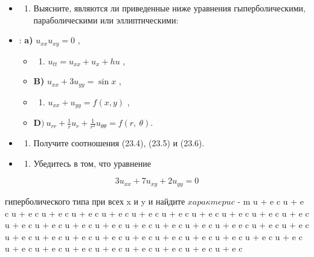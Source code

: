 \documentclass[
  ukrainian,
]{article}
\providecommand{\tightlist}{%
  \setlength{\itemsep}{0pt}\setlength{\parskip}{0pt}}
\begin{document}
\begin{itemize}
\tightlist
\item
  \begin{enumerate}
  \def\labelenumi{\arabic{enumi}.}
  \tightlist
  \item
    Выясните, являются ли приведенные ниже уравнения гыперболическими,
    параболическими или эллиптическими:
  \end{enumerate}
\item
  : \textbf{a)} \(u_{xx} u_{xy} = 0\) ,

  \begin{itemize}
  \tightlist
  \item
    \begin{enumerate}
    \def\labelenumi{\arabic{enumi})}
    \setcounter{enumi}{5}
    \tightlist
    \item
      \(u_{tt} = u_{xx} + u_x + hu\) ,
    \end{enumerate}
  \item
    \textbf{B)} \(u_{xx} + 3u_{yy} = \sin x\) ,
  \item
    \begin{enumerate}
    \def\labelenumi{\alph{enumi})}
    \setcounter{enumi}{17}
    \tightlist
    \item
      \(u_{xx} + u_{yy} = f(x, y)\) ,
    \end{enumerate}
  \item
    \(\mathbf{D} ) \ u_{rr} + \frac{1}{r} u_r + \frac{1}{r^2} u_{\theta \theta} = f(r, \ \theta).\)
  \end{itemize}
\item
  \begin{enumerate}
  \def\labelenumi{\arabic{enumi}.}
  \setcounter{enumi}{1}
  \tightlist
  \item
    Получите соотношения (23.4), (23.5) и (23.6).
  \end{enumerate}
\item
  \begin{enumerate}
  \def\labelenumi{\arabic{enumi}.}
  \setcounter{enumi}{2}
  \tightlist
  \item
    Убедитесь в том, что уравнение
  \end{enumerate}
\end{itemize}

\[
3u_{xx} + 7u_{xy} + 2u_{yy} = 0
\]

гиперболического типа при всех x и y и найдите
\(x a p a \kappa m e p u c\) - m u + e c \kappa u + e c \kappa u + e c
\kappa u + e c \kappa u + e c \kappa u + e c \kappa u + e c \kappa u + e
c \kappa u + e c \kappa u + e c \kappa u + e c \kappa u + e c \kappa u +
e c \kappa u + e c \kappa u + e c \kappa u + e c \kappa u + e c \kappa u
+ e c \kappa u + e c \kappa u + e e c \kappa u + e c \kappa u + e c
\kappa u + e c \kappa u + e c \kappa u + e c \kappa u + e c \kappa u + e
c \kappa u + e c \kappa u + e c \kappa u + e c \kappa u + e c \kappa u +
e c \kappa u + e c \kappa u + e c \kappa u + e c \kappa u + e c \kappa u
+ e c \kappa u + e c \kappa u + e c \kap u + e c \kap
\end{document}
